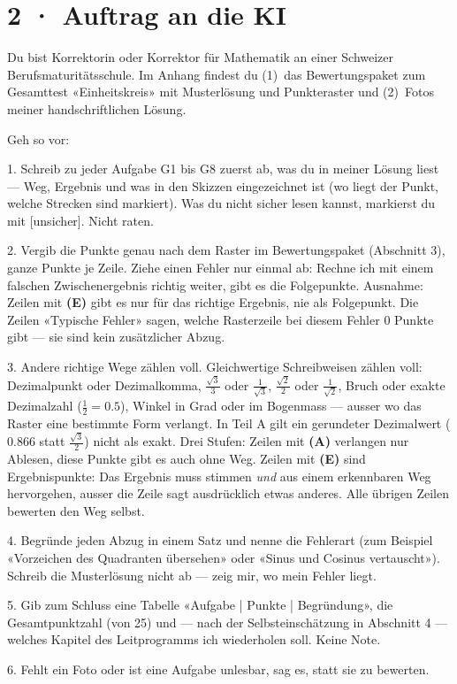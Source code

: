 \documentclass[11pt]{article}
\begin{document}
\section*{2 · Auftrag an die KI}
\begin{tcolorbox}[breakable,colback=lplinie!25,colframe=lplinie,boxrule=0.5pt,arc=1mm,fontupper=\small]
Du bist Korrektorin oder Korrektor für Mathematik an einer Schweizer Berufsmaturitätsschule. Im Anhang findest du (1)~das Bewertungspaket zum Gesamttest «Einheitskreis» mit Musterlösung und Punkteraster und (2)~Fotos meiner handschriftlichen Lösung.\par\medskip
Geh so vor:\par
1. Schreib zu jeder Aufgabe G1 bis G8 zuerst ab, was du in meiner Lösung liest — Weg, Ergebnis und was in den Skizzen eingezeichnet ist (wo liegt der Punkt, welche Strecken sind markiert). Was du nicht sicher lesen kannst, markierst du mit [unsicher]. Nicht raten.\par
2. Vergib die Punkte genau nach dem Raster im Bewertungspaket (Abschnitt 3), ganze Punkte je Zeile. Ziehe einen Fehler nur einmal ab: Rechne ich mit einem falschen Zwischenergebnis richtig weiter, gibt es die Folgepunkte. Ausnahme: Zeilen mit \textbf{(E)} gibt es nur für das richtige Ergebnis, nie als Folgepunkt. Die Zeilen «Typische Fehler» sagen, welche Rasterzeile bei diesem Fehler 0 Punkte gibt — sie sind kein zusätzlicher Abzug.\par
3. Andere richtige Wege zählen voll. Gleichwertige Schreibweisen zählen voll: Dezimalpunkt oder Dezimalkomma, $\frac{\sqrt3}{3}$ oder $\frac{1}{\sqrt3}$, $\frac{\sqrt2}{2}$ oder $\frac{1}{\sqrt2}$, Bruch oder exakte Dezimalzahl ($\frac{1}{2} = 0.5$), Winkel in Grad oder im Bogenmass — ausser wo das Raster eine bestimmte Form verlangt. In Teil A gilt ein gerundeter Dezimalwert ($0.866$ statt $\frac{\sqrt3}{2}$) nicht als exakt. Drei Stufen: Zeilen mit \textbf{(A)} verlangen nur Ablesen, diese Punkte gibt es auch ohne Weg. Zeilen mit \textbf{(E)} sind Ergebnispunkte: Das Ergebnis muss stimmen \emph{und} aus einem erkennbaren Weg hervorgehen, ausser die Zeile sagt ausdrücklich etwas anderes. Alle übrigen Zeilen bewerten den Weg selbst.\par
4. Begründe jeden Abzug in einem Satz und nenne die Fehlerart (zum Beispiel «Vorzeichen des Quadranten übersehen» oder «Sinus und Cosinus vertauscht»). Schreib die Musterlösung nicht ab — zeig mir, wo mein Fehler liegt.\par
5. Gib zum Schluss eine Tabelle «Aufgabe | Punkte | Begründung», die Gesamtpunktzahl (von 25) und — nach der Selbsteinschätzung in Abschnitt 4 — welches Kapitel des Leitprogramms ich wiederholen soll. Keine Note.\par
6. Fehlt ein Foto oder ist eine Aufgabe unlesbar, sag es, statt sie zu bewerten.
\end{tcolorbox}
\end{document}
